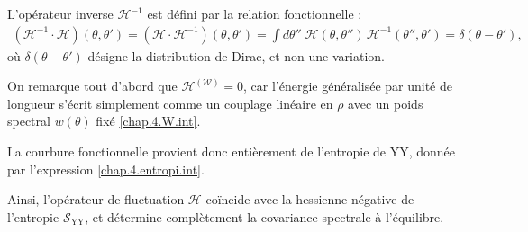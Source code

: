 \medskip


L’opérateur inverse \(\mathcal{H}^{-1}\) est défini par la relation fonctionnelle :
\begin{eqnarray}
	(\mathcal{H}^{-1} \cdot \mathcal{H})(\theta, \theta') = (\mathcal{H} \cdot \mathcal{H}^{-1})(\theta, \theta') = \int d\theta'' \; \mathcal{H}(\theta, \theta'')\, \mathcal{H}^{-1}(\theta'', \theta') = \delta(\theta - \theta'),
	\label{chap:fluctu:eq:hessienner.prod.inv}
\end{eqnarray}
où \(\delta(\theta - \theta')\) désigne la distribution de Dirac, et non une variation.

\medskip

On remarque tout d’abord que \(\mathcal{H}^{(\mathcal{W})} = 0\), car l’énergie généralisée par unité de longueur s’écrit simplement comme un couplage linéaire en \(\rho\)
avec un poids spectral \(w(\theta)\) fixé \eqref{chap.4.W.int}.%

\medskip

La courbure fonctionnelle provient donc entièrement de l'entropie de \gls{YY}, donnée par l’expression \eqref{chap.4.entropi.int}.

\medskip

Ainsi, l’opérateur de fluctuation \(\mathcal{H}\) coïncide avec la hessienne négative de l'entropie \(\mathcal{S}_{\mathrm{YY}}\), et détermine complètement la covariance spectrale à l’équilibre.


